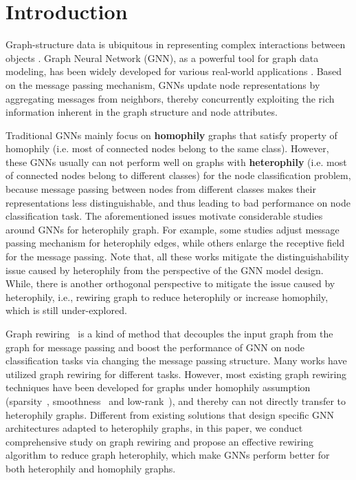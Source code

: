 \documentclass[sigconf]{acmart}
\begin{document}

\maketitle
	\section{Introduction}
	Graph-structure data is ubiquitous in representing complex interactions between objects \cite{du2018traffic,chen2020TSSRGCN,song2020inferring}. Graph Neural Network (GNN), as a powerful tool for graph data modeling, has been widely developed for various real-world applications \cite{du2021tabularnet,yao2022trajgat,wang2020cocogum}. Based on the message passing mechanism, GNNs update node representations by aggregating messages from neighbors, thereby concurrently exploiting the rich information inherent in the graph structure and node attributes. 
	
	Traditional GNNs \cite{GCN,GAT,GraphSAGE} mainly focus on \textbf{homophily} graphs that satisfy property of homophily (i.e. most of connected nodes belong to the same class).
	However, these GNNs usually can not perform well on graphs with \textbf{heterophily} (i.e. most of connected nodes belong to different classes) for the node classification problem, because message passing between nodes from different classes makes their representations less distinguishable, and thus leading to bad performance on node classification task.
	The aforementioned issues motivate considerable studies around GNNs for heterophily graph. 
For example, some studies \cite{wang2021powerful,du2022gbk,yan2021two} adjust message passing mechanism for heterophily edges,  while others \cite{abu2019mixhop,h2gcn,chien2020adaptive,pei2020geom} enlarge the receptive field for the message passing. Note that, all these works mitigate the distinguishability issue caused by heterophily from the perspective of the GNN model design. While, there is another orthogonal perspective to mitigate the issue caused by heterophily, i.e., rewiring graph to reduce heterophily or increase homophily, which is still under-explored. 

	Graph rewiring~\cite{alon2020bottleneck, topping2021understanding, LDS, chen2020iterative} is a kind of method that decouples the input graph from the graph for message passing and boost the performance of GNN on node classification tasks via changing the message passing structure. Many works have utilized graph rewiring for different tasks. However, most existing graph rewiring techniques have been developed for graphs under homophily assumption (sparsity~\cite{sparse}, smoothness~\cite{smooth1, smooth2} and low-rank~\cite{lowrank}), and thereby can not directly transfer to heterophily graphs. Different from existing solutions that design specific GNN architectures adapted to heterophily graphs, in this paper, we conduct comprehensive study on graph rewiring and propose an effective rewiring algorithm to reduce graph heterophily, which make GNNs perform better for both heterophily and homophily graphs.
\end{document}
